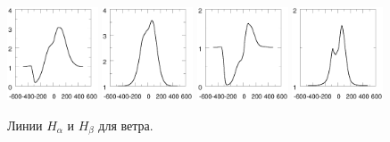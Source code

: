 \documentclass{article}
\begin{document}
\begin{figure}
    \includegraphics[width=0.24\textwidth]{profHa3wind906090}
    \includegraphics[width=0.24\textwidth]{profHa3wind903060}
    \includegraphics[width=0.24\textwidth]{profHb3wind906090}    
    \includegraphics[width=0.24\textwidth]{profHb3wind903060}
    
    \caption{Линии $H_\alpha$ и $H_\beta$ для ветра. }
\end{figure}
\end{document}

